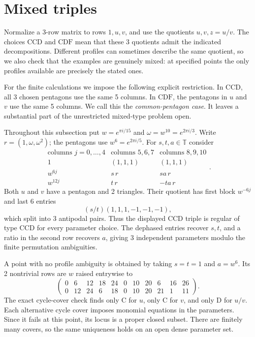 \documentclass[11pt,a4paper]{article}
\theoremstyle{plain}
\theoremstyle{definition}
\theoremstyle{plain}
\begin{document}
\section{Mixed triples}\label{sec:mixed}

Normalize a 3-row matrix to rows $1,u,v$, and use the quotients $u,v,z=u/v$. The choices $\mathrm{CCD}$ and $\mathrm{CDF}$ mean that these 3 quotients admit the indicated decompositions. Different profiles can sometimes describe the same quotient, so we also check that the examples are genuinely mixed: at specified points the only profiles available are precisely the stated ones.

For the finite calculations we impose the following explicit restriction. In $\mathrm{CCD}$, all 3 chosen pentagons use the same 5 columns. In $\mathrm{CDF}$, the pentagons in $u$ and $v$ use the same 5 columns. We call this the \emph{common-pentagon case}. It leaves a substantial part of the unrestricted mixed-type problem open.

\medskip
Throughout this subsection put $w=e^{\pi i/15}$ and $\omega=w^{10}=e^{2\pi i/3}$. Write $r=(1,\omega,\omega^2)$; the pentagons use $w^6=e^{2\pi i/5}$. For $s,t,a\in\mathbb{T}$ consider
\[
\begin{array}{c|c|c}
\text{columns }j=0,\ldots,4&\text{columns }5,6,7&\text{columns }8,9,10\\ \hline
1&(1,1,1)&(1,1,1)\\
w^{6j}&s\,r&sa\,r\\
w^{12j}&t\,r&-ta\,r
\end{array}.
\]
Both $u$ and $v$ have a pentagon and 2 triangles. Their quotient has first block $w^{-6j}$ and last 6 entries
$$(s/t)(1,1,1,-1,-1,-1),$$
which split into 3 antipodal pairs. Thus the displayed $\mathrm{CCD}$ triple is regular of type $\mathrm{CCD}$ for every parameter choice. The dephased entries recover $s,t$, and a ratio in the second row recovers $a$, giving 3 independent parameters modulo the finite permutation ambiguities.

A point with no profile ambiguity is obtained by taking $s=t=1$ and $a=w^{6}$. Its 2 nontrivial rows are $w$ raised entrywise to
$$\begin{pmatrix}
0&6&12&18&24&0&10&20&6&16&26\\
0&12&24&6&18&0&10&20&21&1&11
\end{pmatrix}.$$
The exact cycle-cover check finds only $\mathrm{C}$ for $u$, only $\mathrm{C}$ for $v$, and only $\mathrm{D}$ for $u/v$. Each alternative cycle cover imposes monomial equations in the parameters. Since it fails at this point, its locus is a proper closed subset. There are finitely many covers, so the same uniqueness holds on an open dense parameter set.
\end{document}

